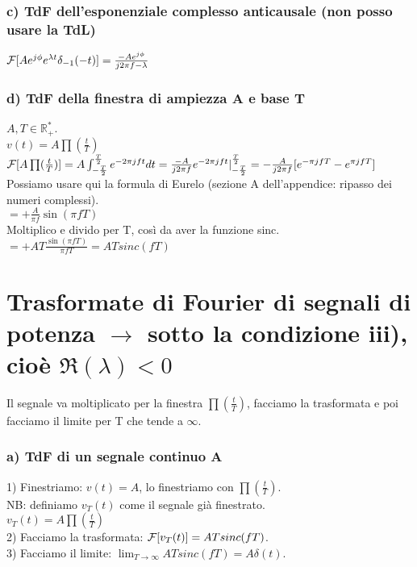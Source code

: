 	\subsubsection{c) TdF dell'esponenziale complesso anticausale (non posso usare la TdL)}
	
	
	$ \mathcal{F} [ A e^{ j \phi} e^{ \lambda t} \delta_{-1}(-t) ] =  \frac{ -Ae^{j \phi}}{j2 \pi f-\lambda} $\\
	
	
	\subsubsection{d) TdF della finestra di ampiezza A e base T}
	$ A, T \in \mathbb{R}^*_+ $.\\
	$ v(t) = A \prod (\frac{t}{T}) $\\
	
	
	$ \mathcal{F} [  A \prod (\frac{t}{T}) ] = A \int_{- \frac{T}{2}}^{ \frac{T}{2}} e^{-2 \pi jft} dt = \frac{-A}{j2 \pi f} e^{-2 \pi jft} |^{\frac{T}{2}}_{-\frac{T}{2}}  = - \frac{A}{j2 \pi f} [ e^{- \pi jf T } - e^{\pi jf T }]  $\\
	Possiamo usare qui la formula di Eurelo (sezione A dell'appendice: ripasso dei numeri complessi).\\
	$ = + \frac{A}{ \pi f} \sin ( \pi f T) $\\
	Moltiplico e divido per T, così da aver la funzione sinc.\\
	$ = + A T \frac{ \sin ( \pi f T) }{ \pi f T } = AT sinc(f T) $\\
	

\section{Trasformate di Fourier di segnali di potenza $ \rightarrow $ sotto la condizione iii), cioè $ \Re ( \lambda ) < 0$ }

	Il segnale va moltiplicato per la finestra $ \prod (\frac{t}{T} )$, facciamo la trasformata e poi facciamo il limite per T che tende a $ \infty$.\\
	
	\subsubsection{a) TdF di un segnale continuo A}
	1) Finestriamo: $ v(t) = A$, lo finestriamo con $ \prod (\frac{t}{T} )$.\\
	NB: definiamo $ v_T(t)$ come il segnale già finestrato.\\
	$ v_T(t) = A \prod (\frac{t}{T} )$\\
	2) Facciamo la trasformata: $ \mathcal{F} [ v_T(t) ] = AT sinc(fT)$.\\
	3) Facciamo il limite: $ \lim_{T \to \infty} AT sinc(fT) = A \delta (t)$.\\
	
